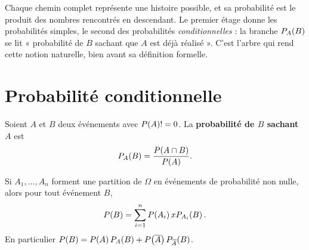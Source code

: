 \begin{visualisation}
\begin{center}
\end{center}

Chaque chemin complet représente une histoire possible, et sa probabilité est
le produit des nombres rencontrés en descendant. Le premier étage donne les
probabilités simples, le second des probabilités \emph{conditionnelles} : la
branche $\probacond{B}{A}$ se lit « probabilité de $B$ sachant que $A$ est
déjà réalisé ». C'est l'arbre qui rend cette notion naturelle, bien avant sa
définition formelle.
\end{visualisation}

\section{Probabilité conditionnelle}

\begin{definition}
Soient $A$ et $B$ deux événements avec $\proba{A} \neq 0$. La
\textbf{probabilité de $B$ sachant $A$} est
\[
  \probacond{B}{A} = \frac{\proba{A \cap B}}{\proba{A}} .
\]
\end{definition}

\begin{propriete}
Si $A_{1},\dots,A_{n}$ forment une partition de $\Omega$ en événements de
probabilité non nulle, alors pour tout événement $B$,
\[
  \proba{B} = \sum_{i=1}^{n}\proba{A_{i}} \times \probacond{B}{A_{i}} .
\]
En particulier
$\proba{B} = \proba{A}\probacond{B}{A}
+\proba{\evtc{A}}\probacond{B}{\evtc{A}}$.
\end{propriete}

